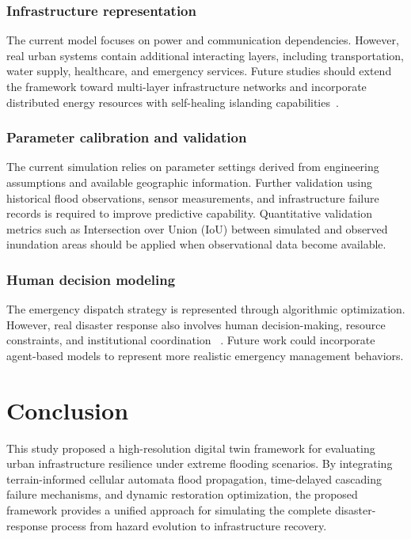 \documentclass[preprint,12pt]{elsarticle}
\begin{document}
\subsubsection{Infrastructure representation}
The current model focuses on power and communication dependencies. However,
real urban systems contain additional interacting layers, including
transportation, water supply, healthcare, and emergency services. Future
studies should extend the framework toward multi-layer infrastructure
networks and incorporate distributed energy resources with self-healing
islanding capabilities~\cite{ouyang2014review}.

\subsubsection{Parameter calibration and validation}
The current simulation relies on parameter settings derived from engineering
assumptions and available geographic information. Further validation using
historical flood observations, sensor measurements, and infrastructure
failure records is required to improve predictive capability. Quantitative
validation metrics such as Intersection over Union (IoU) between simulated
and observed inundation areas should be applied when observational data
become available.

\subsubsection{Human decision modeling}
The emergency dispatch strategy is represented through algorithmic
optimization. However, real disaster response also involves human
decision-making, resource constraints, and institutional coordination
~\cite{dibaldassarre2013socio}. Future work could incorporate agent-based
models to represent more realistic emergency management behaviors.

\section{Conclusion}\label{sec:conclusion}

This study proposed a high-resolution digital twin framework for evaluating
urban infrastructure resilience under extreme flooding scenarios. By
integrating terrain-informed cellular automata flood propagation,
time-delayed cascading failure mechanisms, and dynamic restoration
optimization, the proposed framework provides a unified approach for
simulating the complete disaster-response process from hazard evolution to
infrastructure recovery.
\end{document}
